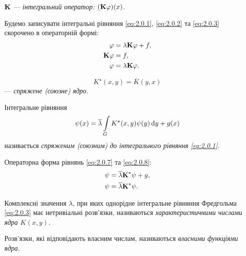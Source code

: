 \begin{definition}
	$\bf{K}$ --- \it{інтегральний оператор}: $(\bf{K} \phi)(x)$.
\end{definition}

Будемо записувати інтегральні рівняння \eqref{eq:2.0.1}, \eqref{eq:2.0.2} та \eqref{eq:2.0.3} скорочено в операторній формі:
\begin{align}
	\label{eq:2.0.4}
	\phi &= \lambda \bf{K} \phi + f, \\
	\label{eq:2.0.5}
	\bf{K} \phi &= f, \\
	\label{eq:2.0.6}
	\phi &= \lambda \bf{K} \phi.
\end{align}

\begin{definition}
	\begin{equation}
		\label{eq:2.0.7}
		K^\star (x, y) = \overline{K}(y, x)
	\end{equation}
	--- \it{спряжене (союзне) ядро}.
\end{definition}

\begin{definition}
	Інтегральне рівняння
	\begin{equation}
		\label{eq:2.0.8}
		\psi(x) = \overline \lambda \Int_G K^\star (x, y) \psi(y) \diff y + g(x)
	\end{equation}
	називається \it{спряженим (союзним)} до інтегрального рівняння \eqref{eq:2.0.1}.
\end{definition}

Операторна форма рівнянь \eqref{eq:2.0.7} та \eqref{eq:2.0.8}:
\begin{align}
	\label{eq:2.0.9}
	\psi &= \overline \lambda \bf{K}^\star  \psi + g, \\
	\label{eq:2.0.10}
	\psi &= \overline \lambda \bf{K}^\star  \psi.
\end{align}

\begin{definition}
	Комплексні значення $\lambda$, при яких однорідне інтегральне рівняння Фредгольма \eqref{eq:2.0.3} має нетривіальні розв'язки, називаються \it{характеристичними числами ядра} $K(x, y)$.
\end{definition}

\begin{definition}
	Розв'язки, які відповідають власним числам, називаються \it{власними функціями} ядра.
\end{definition}

